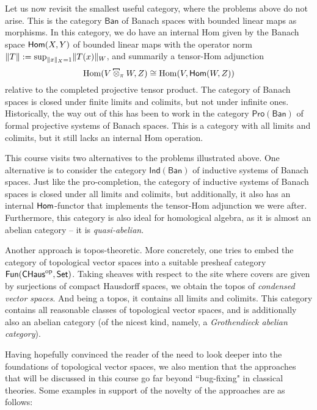 Let us now revisit the smallest useful category, where the problems above do not arise. This is the category \(\mathsf{Ban}\) of Banach spaces with bounded linear maps as morphisms. In this category, we do have an internal Hom given by the Banach space \(\mathsf{Hom}(X,Y)\) of bounded linear maps with the operator norm \(\lVert T\rVert \mathrel{:=} \sup_{\lVert x\rVert_X = 1} \lVert T(x)\rVert_W\), and summarily a  tensor-Hom adjunction \[\Hom(V \hot_\pi W, Z) \cong \Hom(V, \Home(W,Z))\] relative to the completed projective tensor product. The category of Banach spaces is closed under finite limits and colimits, but not under infinite ones. Historically, the way out of this has been to work in the category \(\mathsf{Pro}(\mathsf{Ban})\) of formal projective systems of Banach spaces. This is a category with all limits and colimits, but it still lacks an internal Hom operation.  


This course visits two alternatives to the problems illustrated above. One alternative is to consider the category \(\mathsf{Ind}(\mathsf{Ban})\) of inductive systems of Banach spaces. Just like the pro-completion, the category of inductive systems of Banach spaces is closed under all limits and colimits, but additionally, it also has an internal \(\mathsf{Hom}\)-functor that implements the tensor-Hom adjunction we were after. Furthermore, this category is also ideal for homological algebra, as it is almost an abelian category -- it is \emph{quasi-abelian}.  

Another approach is topos-theoretic. More concretely, one tries to embed the category of topological vector spaces into a suitable presheaf category \(\mathsf{Fun}(\mathsf{CHaus}^{\mathrm{op}}, \mathsf{Set})\). Taking sheaves with respect to the site where covers are given by surjections of compact Hausdorff spaces, we obtain the topos of \emph{condensed vector spaces}.  And being a topos, it contains all limits and colimits. This category contains all reasonable classes of topological vector spaces, and is additionally also an abelian category (of the nicest kind, namely, a \emph{Grothendieck abelian category}).



Having hopefully convinced the reader of the need to look deeper into the foundations of topological vector spaces, we also mention that the approaches that will be discussed in this course go far beyond ``bug-fixing" in classical theories. Some examples in support of the novelty of the approaches are as follows:


